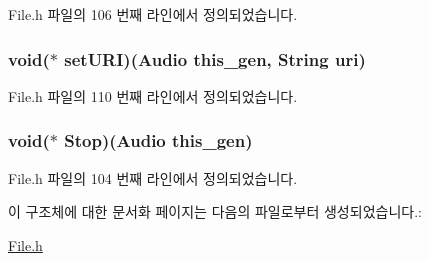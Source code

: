 File.\-h 파일의 106 번째 라인에서 정의되었습니다.

\hypertarget{struct___audio_a1c40fa54cdb34775aeb35430f5901990}{
\subsubsection[{set\-U\-R\-I}]{\setlength{\rightskip}{0pt plus 5cm}void($\ast$  set\-U\-R\-I)({\bf Audio} this\-\_\-gen, {\bf String} uri)}}\label{struct___audio_a1c40fa54cdb34775aeb35430f5901990}


File.\-h 파일의 110 번째 라인에서 정의되었습니다.

\hypertarget{struct___audio_a04a848082fe555df88ae9bc35f4223d3}{
\subsubsection[{Stop}]{\setlength{\rightskip}{0pt plus 5cm}void($\ast$  Stop)({\bf Audio} this\-\_\-gen)}}\label{struct___audio_a04a848082fe555df88ae9bc35f4223d3}


File.\-h 파일의 104 번째 라인에서 정의되었습니다.



이 구조체에 대한 문서화 페이지는 다음의 파일로부터 생성되었습니다.\-:\begin{DoxyCompactItemize}
\item 
\hyperlink{_file_8h}{File.\-h}\end{DoxyCompactItemize}
